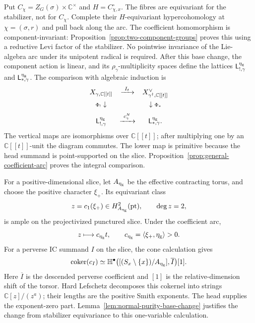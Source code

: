 \documentclass[11pt]{amsart}
\theoremstyle{definition}
\theoremstyle{remark}
\newcommand{\C}{\mathbb C}
\newcommand{\A}{\C[[t]]}
\begin{document}
Put $C_\chi=Z_G(\sigma)\times\mathbb C^\times$ and
$H=C_{\chi,x}^\circ$.  The fibres are equivariant for the stabilizer,
not for $C_\chi$.  Complete their $H$-equivariant hypercohomology at
$\chi=(\sigma,r)$ and pull back along the arc.  The coefficient homomorphism
is component-invariant: Proposition~\ref{prop:two-component-groups}
proves this using a reductive Levi factor of the stabilizer.  No
pointwise invariance of the Lie-algebra arc under its unipotent radical
is required.  After this base change,
the component action is linear, and its $\rho_\gamma$-multiplicity
spaces define the lattices
$\mathsf L_{!,\gamma}^{\eta_{\rm g}}$ and
$\mathsf L_{*,\gamma}^{\eta_{\rm g}}$.
The comparison with algebraic induction is
\begin{equation}\label{eq:master-comparison}
\begin{array}{ccc}
 X_{\gamma,\A}&\xrightarrow{\ I_t\ }&X_{\gamma^\dagger,\A}^{\vee}\\[2mm]
 {\scriptstyle\Phi_!}\downarrow&&\downarrow{\scriptstyle\Phi_*}\\[2mm]
 \mathsf L_{!,\gamma}^{\eta_{\rm g}}&
 \xrightarrow{\ c_\gamma^N\ }&
 \mathsf L_{*,\gamma}^{\eta_{\rm g}}.
\end{array}
\end{equation}
The vertical maps are isomorphisms over $\A$; after multiplying one by
an $\A$-unit the diagram commutes.  The lower map is primitive because
the head summand is point-supported on the slice.
Proposition~\ref{prop:general-coefficient-arc} proves the integral
comparison.

For a positive-dimensional slice, let $A_{\eta_{\rm g}}$ be the effective
contracting torus, and choose the
positive character $\xi_+$.  Its equivariant class
\[
 z=c_1(\xi_+)\in H^2_{A_{\eta_{\rm g}}}(\mathrm{pt}),\qquad
 \deg z=2,
\]
is ample on the projectivized punctured slice.  Under the coefficient arc,
\[
 z\longmapsto c_{\eta_{\rm g}}t,\qquad
 c_{\eta_{\rm g}}=\langle\xi_+,\eta_{\rm g}\rangle>0.
\]
For a perverse IC summand $I$ on the slice, the cone calculation gives
\[
 \operatorname{coker}(c_I)
 \simeq\mathbb H^\bullet
 \bigl([(S_x\setminus\{x\})/A_{\eta_{\rm g}}],\overline I\bigr)[1].
\]
Here $\overline I$ is the descended perverse coefficient and $[1]$ is
the relative-dimension shift of the torsor.
Hard Lefschetz decomposes this cokernel into strings
$\mathbb C[z]/(z^a)$; their lengths are the positive Smith exponents.
The head supplies the exponent-zero part.
Lemma~\ref{lem:normal-purity-base-change} justifies the change from
stabilizer equivariance to this one-variable calculation.
\end{document}
